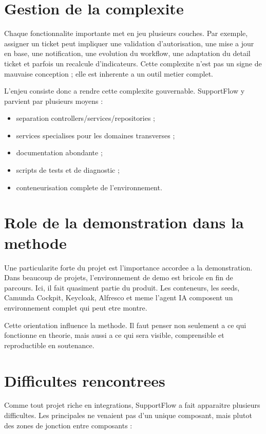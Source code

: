 \section{Gestion de la complexite}

Chaque fonctionnalite importante met en jeu plusieurs couches. Par exemple, assigner un ticket peut impliquer une validation d'autorisation, une mise a jour en base, une notification, une evolution du workflow, une adaptation du detail ticket et parfois un recalcule d'indicateurs. Cette complexite n'est pas un signe de mauvaise conception ; elle est inherente a un outil metier complet.

L'enjeu consiste donc a rendre cette complexite gouvernable. SupportFlow y parvient par plusieurs moyens :

\begin{itemize}[leftmargin=1.2cm]
  \item separation controllers/services/repositories ;
  \item services specialises pour les domaines transverses ;
  \item documentation abondante ;
  \item scripts de tests et de diagnostic ;
  \item conteneurisation complete de l'environnement.
\end{itemize}

\section{Role de la demonstration dans la methode}

Une particularite forte du projet est l'importance accordee a la demonstration. Dans beaucoup de projets, l'environnement de demo est bricole en fin de parcours. Ici, il fait quasiment partie du produit. Les conteneurs, les seeds, Camunda Cockpit, Keycloak, Alfresco et meme l'agent IA composent un environnement complet qui peut etre montre.

Cette orientation influence la methode. Il faut penser non seulement a ce qui fonctionne en theorie, mais aussi a ce qui sera visible, comprensible et reproductible en soutenance.

\section{Difficultes rencontrees}

Comme tout projet riche en integrations, SupportFlow a fait apparaitre plusieurs difficultes. Les principales ne venaient pas d'un unique composant, mais plutot des zones de jonction entre composants :

